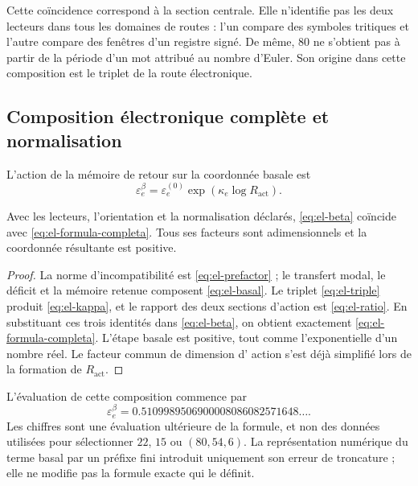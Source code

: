 Cette coïncidence correspond à la section centrale. Elle n'identifie pas les deux lecteurs dans tous les domaines de routes : l'un compare des symboles tritiques et l'autre compare des fenêtres d'un registre signé. De même, \(80\) ne s'obtient pas à partir de la période d'un mot attribué au nombre d'Euler. Son origine dans cette composition est le triplet de la route électronique.



\subsection{Composition électronique complète et normalisation}

\begin{definition}
L'action de la mémoire de retour sur la coordonnée basale est
\begin{equation}
 \varepsilon_e^\beta
 =\varepsilon_e^{(0)}\exp\!\left(\kappa_e\log R_{\mathrm{act}}\right).
 \label{eq:el-beta}
\end{equation}
\end{definition}

\begin{theorem}
Avec les lecteurs, l'orientation et la normalisation déclarés,
\eqref{eq:el-beta} coïncide avec \eqref{eq:el-formula-completa}. Tous
ses facteurs sont adimensionnels et la coordonnée résultante est positive.
\end{theorem}
\begin{proof}
La norme d'incompatibilité est \eqref{eq:el-prefactor} ; le transfert modal,
le déficit et la mémoire retenue composent \eqref{eq:el-basal}. Le
triplet \eqref{eq:el-triple} produit \eqref{eq:el-kappa}, et le rapport des
deux sections d'action est \eqref{eq:el-ratio}. En substituant ces
trois identités dans \eqref{eq:el-beta}, on obtient exactement
\eqref{eq:el-formula-completa}. L'étape basale est positive, tout comme
l'exponentielle d'un nombre réel. Le facteur commun de dimension d'
action s'est déjà simplifié lors de la formation de \(R_{\mathrm{act}}\).
\end{proof}

L'évaluation de cette composition commence par
\begin{equation}
 \varepsilon_e^\beta
 =0.5109989506900008086082571648\ldots.
 \label{eq:el-beta-decimal}
\end{equation}
Les chiffres sont une évaluation ultérieure de la formule, et non des données utilisées
pour sélectionner \(22\), \(15\) ou \((80,54,6)\). La représentation
numérique du terme basal par un préfixe fini introduit uniquement son
erreur de troncature ; elle ne modifie pas la formule exacte qui le définit.

